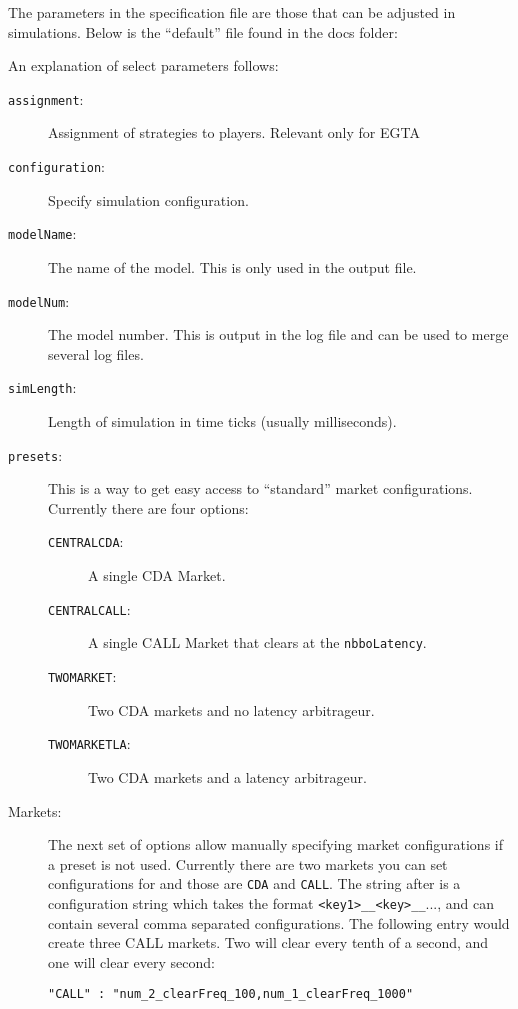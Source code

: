 \documentclass[11pt]{article}
\begin{document}
The parameters in the specification file are those that can be adjusted in
simulations. Below is the ``default''  file found in
the docs folder:



An explanation of select parameters follows:
\begin{description}
\item[\texttt{assignment}:] Assignment of strategies to players. Relevant only
  for EGTA
\item[\texttt{configuration}:] Specify simulation configuration.
\item[\texttt{modelName}:] The name of the model. This is only used in the
  output file.
\item[\texttt{modelNum}:] The model number. This is output in the log file and
  can be used to merge several log files.
\item[\texttt{simLength}:] Length of simulation in time ticks (usually
  milliseconds).
\item[\texttt{presets}:] This is a way to get easy access to ``standard'' market
  configurations. Currently there are four options:
  \begin{description}
  \item[\texttt{CENTRALCDA}:] A single CDA Market.
  \item[\texttt{CENTRALCALL}:] A single CALL Market that clears at the \texttt{nbboLatency}.
  \item[\texttt{TWOMARKET}:] Two CDA markets and no latency arbitrageur.
  \item[\texttt{TWOMARKETLA}:] Two CDA markets and a latency arbitrageur.
  \end{description}
\item[Markets:] The next set of options allow manually specifying market configurations
  if a preset is not used. Currently there are two markets you can set
  configurations for and those are \texttt{CDA} and \texttt{CALL}. The string
  after is a configuration string which takes the format
  \texttt{<key1>\_<value1>\_<key>\_<value2>\_}..., and can contain several comma
  separated configurations. The following entry would create three CALL
  markets. Two will clear every tenth of a second, and one will clear every
  second:

\begin{verbatim}
"CALL" : "num_2_clearFreq_100,num_1_clearFreq_1000"
\end{verbatim}


\end{description}
\end{document}
